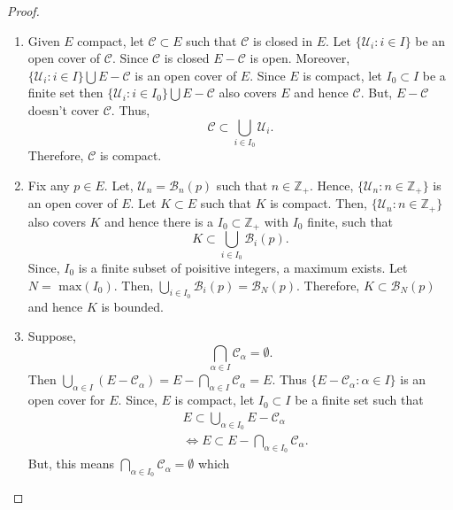 \begin{proof}
    \begin{enumerate}
	\item Given $E$ compact, let $\mathcal{C} \subset E$ such that $\mathcal{C}$ is closed in
	    $E$. Let $\left.\lbrace \mathcal{U}_i : i \in I \rbrace\right.$ be an open cover of
	    $\mathcal{C}$. Since $\mathcal{C}$ is closed $E - \mathcal{C}$ is open. Moreover, 
	    $\left.\lbrace \mathcal{U}_i : i \in I \rbrace\right. \bigcup E - \mathcal{C} $ is an
	    open cover of $E$. Since $E$ is compact, let $I_0 \subset I$ be a finite set then
	   $\left.\lbrace \mathcal{U}_i : i \in I_0 \rbrace\right. \bigcup E - \mathcal{C} $ also 
	   covers $E$ and hence $\mathcal{C}$. But, $E - \mathcal{C}$ doesn't cover $\mathcal{C}$. 
	   Thus, \[\mathcal{C} \subset \bigcup_{i \in I_0}\mathcal{U}_i . \] Therefore, 
	   $\mathcal{C}$ is compact.  
       \item Fix any $p \in E$. Let, $\mathcal{U}_n = \mathcal{B}_n(p)$ such that $n \in
	   \mathbb{Z}_+$. Hence, $\left.\lbrace \mathcal{U}_n : n \in \mathbb{Z}_+ \rbrace\right.$
	   is an open cover of $E$.  Let $K \subset E$ such that
	   $K$ is compact. Then, $\left.\lbrace \mathcal{U}_n : n \in \mathbb{Z}_+ \rbrace\right.$
	   also covers $K$ and hence there is a $I_0 \subset \mathbb{Z}_+$ with $I_0$ finite, such
	   that \[ K \subset \bigcup_{i \in I_0}\mathcal{B}_i(p) .\] Since, $I_0$ is a finite subset
	   of poisitive integers, a maximum exists. Let $N = \text{ max}(I_0)$. Then, 
	   $\bigcup_{i \in I_0}\mathcal{B}_i(p) = \mathcal{B}_N(p)$. Therefore, $K \subset 
	   \mathcal{B}_N(p)$ and hence $K$ is bounded. 
       \item Suppose,  \[ \bigcap_{\alpha \in I}\mathcal{C}_{\alpha} = \emptyset .\] Then 
	   $\bigcup_{\alpha \in I}\left(E - \mathcal{C}_{\alpha}\right) = E - \bigcap_{\alpha \in I}
	   \mathcal{C}_{\alpha} = E$. Thus $\left.\lbrace E - \mathcal{C}_{\alpha} : \alpha \in I
	       \rbrace\right.$ is an open cover for $E$. Since, $E$ is compact, let $I_0 \subset I$
	   be a finite set such that 
	   \begin{displaymath}
	       \begin{aligned}
		   & E \subset \bigcup_{\alpha \in I_0}E - \mathcal{C}_{\alpha} \\
		   & \Leftrightarrow E \subset E - \bigcap_{\alpha \in I_0} \mathcal{C}_{\alpha}. 
	       \end{aligned}
	   \end{displaymath} 
	   But, this means $\bigcap_{\alpha \in I_0} \mathcal{C}_{\alpha} = \emptyset$ which

\end{enumerate}
\end{proof}
